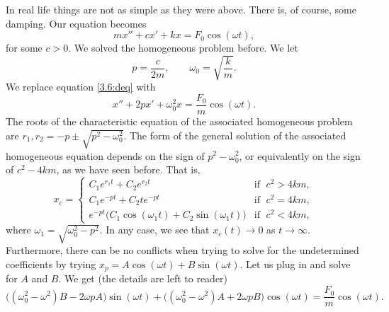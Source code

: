 \documentclass[12pt]{book}
\begin{document}
In real life things are not as simple as they were above.  There is,
of course, some damping.  Our equation becomes
\begin{equation} \label{3.6:deq}
mx'' + cx' + kx = F_0 \cos (\omega t) ,
\end{equation}
for some $c > 0$.  We solved the homogeneous problem before.  We let
\begin{equation*}
p = \frac{c}{2m},  \qquad \omega_0 = \sqrt{\frac{k}{m}} .
\end{equation*}
We replace equation \eqref{3.6:deq} with
\begin{equation*}
x'' + 2px' + \omega_0^2x = \frac{F_0}{m} \cos (\omega t) .
\end{equation*}
The roots of the characteristic equation of the associated
homogeneous problem are $r_1,r_2 = -p \pm \sqrt{p^2 - \omega_0^2}$.  The form
of the general solution of the associated homogeneous equation
depends on the sign of $p^2 - \omega_0^2$, or
equivalently on the sign of $c^2 - 4km$, as we have
seen before.  That is,
\begin{equation*}
x_c =
\begin{cases}
C_1 e^{r_1 t} + C_2 e^{r_2 t} & \text{if } \; c^2 > 4km , \\
C_1 e^{-p t} + C_2 t e^{-p t} & \text{if } \; c^2 = 4km , \\
e^{-p t} \bigl( C_1 \cos (\omega_1 t) + C_2 \sin (\omega_1 t) \bigr) &
  \text{if } \; c^2 < 4km ,
\end{cases}
\end{equation*}
where $\omega_1 = \sqrt{\omega_0^2 - p^2}$.  In any case, we see that
$x_c(t) \to 0$ as $t \to \infty$.  Furthermore,
there can be no conflicts when trying to solve for the
undetermined coefficients by trying $x_p = A \cos (\omega t)
+ B \sin (\omega t)$.
Let us plug
in and solve for $A$ and $B$.
We get (the  %
details are left to reader)
\begin{equation*}
\bigl((\omega_0^2  - \omega^2)B - 2\omega p A\bigr) \sin (\omega t)
+
\bigl((\omega_0^2  - \omega^2)A + 2\omega p B\bigr) \cos (\omega t)
=
\frac{F_0}{m} \cos (\omega t) .
\end{equation*}
\end{document}
